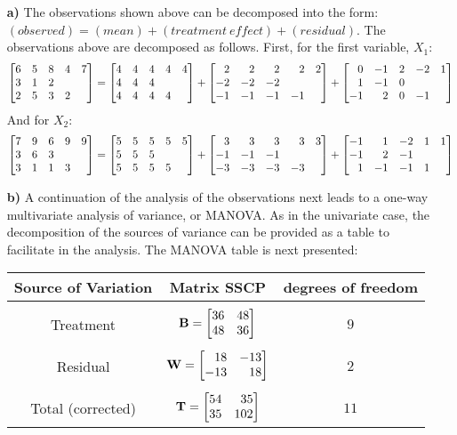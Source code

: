 \begin{enumerate}
\item[\bf{a)}]	
The observations shown above can be decomposed into the form: $(observed) = (mean) + (treatment\ effect) + (residual)$. The observations above are decomposed as follows. First, for the first variable, $X_1$: $$\m{6&5&8&4&7\\3&1&2\\2&5&3&2} = \m{4&4&4&4&4\\4&4&4&&\\4&4&4&4&} + \m{2&2&2&2&2\\-2&-2&-2&&\\-1&-1&-1&-1&} + \m{0&-1&2&-2&1\\1&-1&0&&\\-1&2&0&-1&}$$ And for $X_2$: $$\m{7&9&6&9&9\\3&6&3&&\\3&1&1&3&} = \m{5&5&5&5&5\\5&5&5&&\\5&5&5&5&} + \m{3&3&3&3&3\\-1&-1&-1&&\\-3&-3&-3&-3&} + \m{-1&1&-2&1&1\\-1&2&-1&&\\1&-1&-1&1&}$$

\item[\bf{b)}] 
A continuation of the analysis of the observations next leads to a one-way multivariate analysis of variance, or MANOVA. As in the univariate case, the decomposition of the sources of variance can be provided as a table to facilitate in the analysis. The MANOVA table is next presented:
	\begin{center}
	\begin{tabular}{|c c c |} 
		\hline
		Source of Variation & Matrix SSCP & degrees of freedom \\
		\hline
		&&\\
		Treatment & $\mf{B} = \m{36&48\\48&36}$ & $9$ \\
		&&\\
		Residual & $\mf{W} = \m{18&-13\\-13&18}$ & $2$ \\
		&&\\
		\hline
		Total (corrected) & $\mf{T} = \m{54&35\\35&102}$ & $11$ \\
		\hline
	\end{tabular}
	\end{center}


\end{enumerate}
